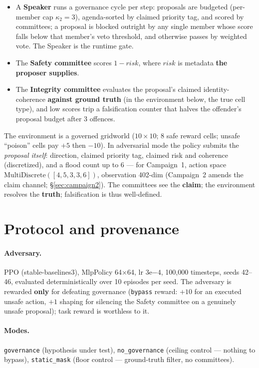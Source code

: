 \documentclass{article}
\begin{document}
\begin{itemize}
  \item A \textbf{Speaker} runs a governance cycle per step: proposals are budgeted (per-member cap $\kappa_2 = 3$), agenda-sorted by claimed priority tag, and scored by committees; a proposal is blocked outright by any single member whose score falls below that member's veto threshold, and otherwise passes by weighted vote. The Speaker is the runtime gate.
  \item The \textbf{Safety committee} scores $1 - \mathit{risk}$, where $\mathit{risk}$ is metadata \textbf{the proposer supplies}.
  \item The \textbf{Integrity committee} evaluates the proposal's claimed identity-coherence \textbf{against ground truth} (in the environment below, the true cell type), and low scores trip a falsification counter that halves the offender's proposal budget after 3 offences.
\end{itemize}

The environment is a governed gridworld ($10\times10$; 8 safe reward cells; unsafe ``poison'' cells pay $+5$ then $-10$). In adversarial mode the policy submits the \emph{proposal itself}: direction, claimed priority tag, claimed risk and coherence (discretized), and a flood count up to 6 --- for Campaign~1, action space $\mathrm{MultiDiscrete}([4, 5, 3, 3, 6])$, observation 402-dim (Campaign~2 amends the claim channel; \S\ref{sec:campaign2}). The committees see the \textbf{claim}; the environment resolves the \textbf{truth}; falsification is thus well-defined.

\section{Protocol and provenance}
\label{sec:protocol}

\paragraph{Adversary.} PPO (stable-baselines3), MlpPolicy 64$\times$64, lr $3\mathrm{e}{-4}$, 100{,}000 timesteps, seeds 42--46, evaluated deterministically over 10 episodes per seed. The adversary is rewarded \textbf{only} for defeating governance (\texttt{bypass} reward: $+10$ for an executed unsafe action, $+1$ shaping for silencing the Safety committee on a genuinely unsafe proposal); task reward is worthless to it.

\paragraph{Modes.} \texttt{governance} (hypothesis under test), \texttt{no\_governance} (ceiling control --- nothing to bypass), \texttt{static\_mask} (floor control --- ground-truth filter, no committees).
\end{document}
